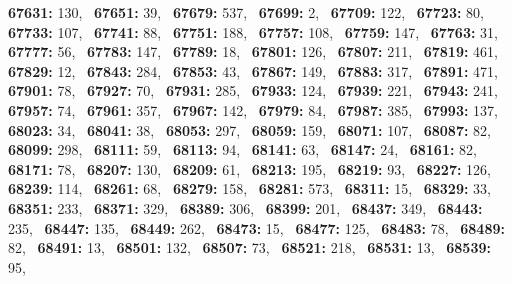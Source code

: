 \textbf{67631:} 130,\allowbreak~ 
\textbf{67651:} 39,\allowbreak~ 
\textbf{67679:} 537,\allowbreak~ 
\textbf{67699:} 2,\allowbreak~ 
\textbf{67709:} 122,\allowbreak~ 
\textbf{67723:} 80,\allowbreak~ 
\textbf{67733:} 107,\allowbreak~ 
\textbf{67741:} 88,\allowbreak~ 
\textbf{67751:} 188,\allowbreak~ 
\textbf{67757:} 108,\allowbreak~ 
\textbf{67759:} 147,\allowbreak~ 
\textbf{67763:} 31,\allowbreak~ 
\textbf{67777:} 56,\allowbreak~ 
\textbf{67783:} 147,\allowbreak~ 
\textbf{67789:} 18,\allowbreak~ 
\textbf{67801:} 126,\allowbreak~ 
\textbf{67807:} 211,\allowbreak~ 
\textbf{67819:} 461,\allowbreak~ 
\textbf{67829:} 12,\allowbreak~ 
\textbf{67843:} 284,\allowbreak~ 
\textbf{67853:} 43,\allowbreak~ 
\textbf{67867:} 149,\allowbreak~ 
\textbf{67883:} 317,\allowbreak~ 
\textbf{67891:} 471,\allowbreak~ 
\textbf{67901:} 78,\allowbreak~ 
\textbf{67927:} 70,\allowbreak~ 
\textbf{67931:} 285,\allowbreak~ 
\textbf{67933:} 124,\allowbreak~ 
\textbf{67939:} 221,\allowbreak~ 
\textbf{67943:} 241,\allowbreak~ 
\textbf{67957:} 74,\allowbreak~ 
\textbf{67961:} 357,\allowbreak~ 
\textbf{67967:} 142,\allowbreak~ 
\textbf{67979:} 84,\allowbreak~ 
\textbf{67987:} 385,\allowbreak~ 
\textbf{67993:} 137,\allowbreak~ 
\textbf{68023:} 34,\allowbreak~ 
\textbf{68041:} 38,\allowbreak~ 
\textbf{68053:} 297,\allowbreak~ 
\textbf{68059:} 159,\allowbreak~ 
\textbf{68071:} 107,\allowbreak~ 
\textbf{68087:} 82,\allowbreak~ 
\textbf{68099:} 298,\allowbreak~ 
\textbf{68111:} 59,\allowbreak~ 
\textbf{68113:} 94,\allowbreak~ 
\textbf{68141:} 63,\allowbreak~ 
\textbf{68147:} 24,\allowbreak~ 
\textbf{68161:} 82,\allowbreak~ 
\textbf{68171:} 78,\allowbreak~ 
\textbf{68207:} 130,\allowbreak~ 
\textbf{68209:} 61,\allowbreak~ 
\textbf{68213:} 195,\allowbreak~ 
\textbf{68219:} 93,\allowbreak~ 
\textbf{68227:} 126,\allowbreak~ 
\textbf{68239:} 114,\allowbreak~ 
\textbf{68261:} 68,\allowbreak~ 
\textbf{68279:} 158,\allowbreak~ 
\textbf{68281:} 573,\allowbreak~ 
\textbf{68311:} 15,\allowbreak~ 
\textbf{68329:} 33,\allowbreak~ 
\textbf{68351:} 233,\allowbreak~ 
\textbf{68371:} 329,\allowbreak~ 
\textbf{68389:} 306,\allowbreak~ 
\textbf{68399:} 201,\allowbreak~ 
\textbf{68437:} 349,\allowbreak~ 
\textbf{68443:} 235,\allowbreak~ 
\textbf{68447:} 135,\allowbreak~ 
\textbf{68449:} 262,\allowbreak~ 
\textbf{68473:} 15,\allowbreak~ 
\textbf{68477:} 125,\allowbreak~ 
\textbf{68483:} 78,\allowbreak~ 
\textbf{68489:} 82,\allowbreak~ 
\textbf{68491:} 13,\allowbreak~ 
\textbf{68501:} 132,\allowbreak~ 
\textbf{68507:} 73,\allowbreak~ 
\textbf{68521:} 218,\allowbreak~ 
\textbf{68531:} 13,\allowbreak~ 
\textbf{68539:} 95,\allowbreak~ 

